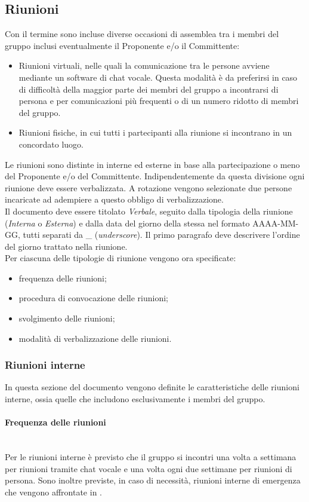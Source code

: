 \subsection{Riunioni}
Con il termine  sono incluse diverse occasioni di assemblea tra i membri del gruppo inclusi eventualmente il Proponente e/o il Committente:
\begin{itemize}
\item Riunioni virtuali, nelle quali la comunicazione tra le persone avviene mediante un software di chat vocale. Questa modalità è da preferirsi in caso di difficoltà della maggior parte dei membri del gruppo a incontrarsi di persona e per comunicazioni più frequenti o di un numero ridotto di membri del gruppo.
\item Riunioni fisiche, in cui tutti i partecipanti alla riunione si incontrano in un concordato luogo.	
\end{itemize}
Le riunioni sono distinte in interne ed esterne in base alla partecipazione o meno del Proponente e/o del Committente. Indipendentemente da questa divisione ogni riunione deve essere verbalizzata. A rotazione vengono selezionate due persone incaricate ad adempiere a questo obbligo di verbalizzazione.\\
Il documento deve essere titolato \textit{Verbale}, seguito dalla tipologia della riunione (\textit{Interna} o \textit{Esterna}) e dalla data del giorno della stessa nel formato AAAA-MM-GG, tutti separati da \_ (\textit{underscore}). Il primo paragrafo deve descrivere l'ordine del giorno trattato nella riunione.\\
Per ciascuna delle tipologie di riunione vengono ora specificate:
\begin{itemize}
	\item frequenza delle riunioni;
	\item procedura di convocazione delle riunioni;
	\item svolgimento delle riunioni;
	\item modalità di verbalizzazione delle riunioni.	 
\end{itemize}

\subsubsection{Riunioni interne}
In questa sezione del documento vengono definite le caratteristiche delle riunioni interne, ossia quelle che includono esclusivamente i membri del gruppo.

\paragraph{Frequenza delle riunioni}\mbox{}\\
Per le riunioni interne è previsto che il gruppo si incontri una volta a settimana per riunioni tramite chat vocale e una volta ogni due settimane per riunioni di persona. Sono inoltre previste, in caso di necessità, riunioni interne di emergenza che vengono affrontate in .

